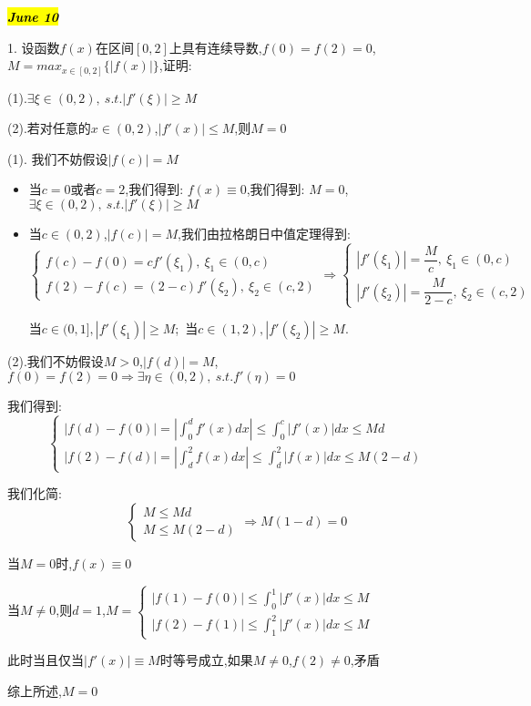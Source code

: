 \hl{\textbf{\textit{June 10}}}

1. 设函数$f(x)$在区间$[0,2]$上具有连续导数,$f(0)=f(2)=0$,$M=max_{x\in[0,2]}\{|f(x)|\}$,证明: 

(1).$\exists\xi\in(0,2),\ s.t. |f'(\xi)|\geq M$

(2).若对任意的$x\in(0,2)$,$|f'(x)|\leq M$,则$M=0$
\begin{solution}
	
	(1). 我们不妨假设$|f(c)|=M$
	\begin{itemize}
		\item 当$c=0\text{或者}c=2$,我们得到: $f(x)\equiv 0$,我们得到: $M=0$,$\exists\xi\in(0,2),\ s.t. |f'(\xi)|\geq M$
		\item 当$c\in(0,2)$,$|f(c)|=M$,我们由拉格朗日中值定理得到: 
		$$\left\lbrace
		\begin{array}{l}
			f(c)-f(0)=cf'(\xi_{1}),\ \xi_{1}\in(0,c)\\
			f(2)-f(c)=(2-c)f'(\xi_{2}),\ \xi_{2}\in(c,2)
		\end{array}
		\right. \Rightarrow \left\lbrace
		\begin{array}{l}
			|f'(\xi_{1})|=\dfrac{M}{c},\ \xi_{1}\in(0,c)\\
			|f'(\xi_{2})|=\dfrac{M}{2-c},\ \xi_{2}\in(c,2)
		\end{array}
		\right. $$
		
		当$c\in(0,1],|f'(\xi_{1})|\geq M$;\ 当$c\in(1,2),|f'(\xi_{2})|\geq M$.
	\end{itemize}
	
	(2).我们不妨假设$M>0$,$|f(d)|=M$,$f(0)=f(2)=0\Rightarrow \exists \eta\in(0,2),\ s.t. f'(\eta)=0$
	
	我们得到: 
	$$\left\lbrace
	\begin{array}{l}
		|f(d)-f(0)|=|\int_{0}^{d}f'(x)dx|\leq \int_{0}^{c}|f'(x)|dx\leq Md\\
		|f(2)-f(d)|=|\int_{d}^{2}f(x)dx|\leq \int_{d}^{2}|f(x)|dx\leq M(2-d)
	\end{array}
	\right.$$

	我们化简:
	$$\left\lbrace
	\begin{array}{l}
		M\leq Md\\
		M\leq M(2-d)
	\end{array}
	\right.  
	\Rightarrow 
	M(1-d)=0$$
	
	当$M=0$时,$f(x)\equiv 0$
	
	当$M\neq 0$,则$d=1$,$M=\left\lbrace
	\begin{array}{l}
		|f(1)-f(0)|\leq \int_{0}^{1}|f'(x)|dx\leq M\\
		|f(2)-f(1)|\leq \int_{1}^{2}|f'(x)|dx\leq M
	\end{array}
	\right. $	
	
	此时当且仅当$|f'(x)|\equiv M$时等号成立,如果$M\neq 0$,$f(2)\neq 0$,矛盾
	
	综上所述,$M=0$
\end{solution}

